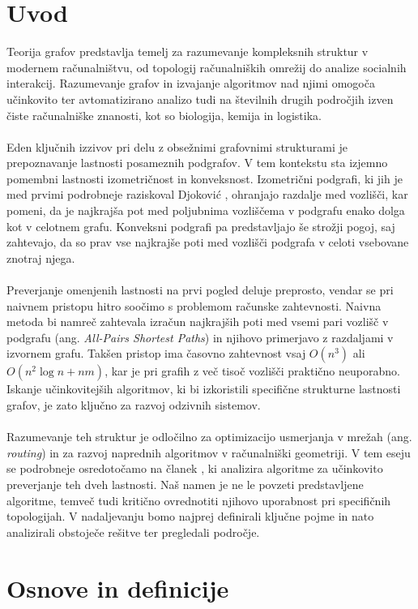 \documentclass[sigconf
]{acmart}
\theoremstyle{definition}
\begin{document}
\section{Uvod}
Teorija grafov predstavlja temelj za razumevanje kompleksnih struktur v modernem računalništvu, od topologij računalniških omrežij do analize socialnih interakcij. Razumevanje grafov in izvajanje algoritmov nad njimi omogoča učinkovito ter avtomatizirano analizo tudi na številnih drugih področjih izven čiste računalniške znanosti, kot so biologija, kemija in logistika.
\\\\
Eden ključnih izzivov pri delu z obsežnimi grafovnimi strukturami je prepoznavanje lastnosti posameznih podgrafov. V tem kontekstu sta izjemno pomembni lastnosti izometričnost in konveksnost. Izometrični podgrafi, ki jih je med prvimi podrobneje raziskoval Djoković \cite{djokovic1973}, ohranjajo razdalje med vozlišči, kar pomeni, da je najkrajša pot med poljubnima vozliščema v podgrafu enako dolga kot v celotnem grafu. Konveksni podgrafi pa predstavljajo še strožji pogoj, saj zahtevajo, da so prav vse najkrajše poti med vozlišči podgrafa v celoti vsebovane znotraj njega.
\\\\
Preverjanje omenjenih lastnosti na prvi pogled deluje preprosto, vendar se pri naivnem pristopu hitro soočimo s problemom računske zahtevnosti. Naivna metoda bi namreč zahtevala izračun najkrajših poti med vsemi pari vozlišč v podgrafu (ang. \textit{All-Pairs Shortest Paths}) in njihovo primerjavo z razdaljami v izvornem grafu. Takšen pristop ima časovno zahtevnost vsaj $O(n^3)$ ali $O(n^2 \log n + nm)$, kar je pri grafih z več tisoč vozlišči praktično neuporabno. Iskanje učinkovitejših algoritmov, ki bi izkoristili specifične strukturne lastnosti grafov, je zato ključno za razvoj odzivnih sistemov.
\\\\
Razumevanje teh struktur je odločilno za optimizacijo usmerjanja v mrežah (ang. \textit{routing}) in za razvoj naprednih algoritmov v računalniški geometriji. V tem eseju se podrobneje osredotočamo na članek \cite{main_paper}, ki analizira algoritme za učinkovito preverjanje teh dveh lastnosti. Naš namen je ne le povzeti predstavljene algoritme, temveč tudi kritično ovrednotiti njihovo uporabnost pri specifičnih topologijah. V nadaljevanju bomo najprej definirali ključne pojme in nato analizirali obstoječe rešitve ter pregledali področje.
\section{Osnove in definicije}
\end{document}
